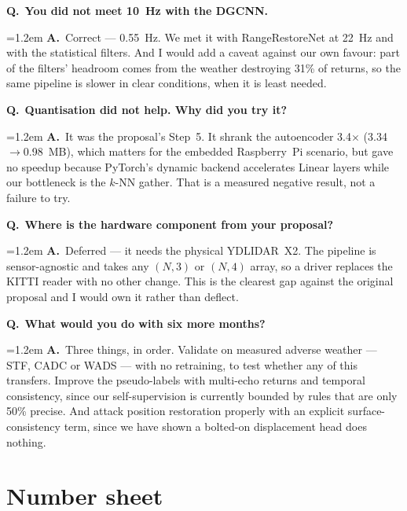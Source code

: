 \documentclass[11pt,a4paper]{article}
\newcommand{\Q}[1]{\medskip\noindent\textcolor{qcol}{\textbf{Q.}}\ \textbf{#1}\par\nopagebreak}
\newcommand{\A}[1]{\noindent\hangindent=1.2em\hangafter=0 \textcolor{inkcol}{\textbf{A.}}\ #1\par}
\begin{document}
\Q{You did not meet 10~Hz with the DGCNN.}
\A{Correct --- 0.55~Hz. We met it with RangeRestoreNet at 22~Hz and with the
statistical filters. And I would add a caveat against our own favour: part of
the filters' headroom comes from the weather destroying 31\% of returns, so
the same pipeline is slower in clear conditions, when it is least needed.}

\Q{Quantisation did not help. Why did you try it?}
\A{It was the proposal's Step~5. It shrank the autoencoder 3.4$\times$
(3.34$\rightarrow$0.98~MB), which matters for the embedded Raspberry~Pi
scenario, but gave no speedup because PyTorch's dynamic backend accelerates
Linear layers while our bottleneck is the $k$-NN gather. That is a measured
negative result, not a failure to try.}

\Q{Where is the hardware component from your proposal?}
\A{Deferred --- it needs the physical YDLIDAR~X2. The pipeline is
sensor-agnostic and takes any $(N,3)$ or $(N,4)$ array, so a driver replaces
the KITTI reader with no other change. This is the clearest gap against the
original proposal and I would own it rather than deflect.}

\Q{What would you do with six more months?}
\A{Three things, in order. Validate on measured adverse weather --- STF, CADC
or WADS --- with no retraining, to test whether any of this transfers. Improve
the pseudo-labels with multi-echo returns and temporal consistency, since our
self-supervision is currently bounded by rules that are only 50\% precise.
And attack position restoration properly with an explicit surface-consistency
term, since we have shown a bolted-on displacement head does nothing.}

\section{Number sheet}
\label{sec:numbers}
\end{document}
